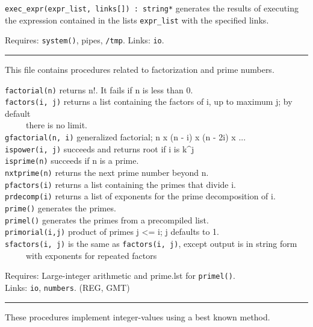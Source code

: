 \texttt{exec\_expr(expr\_list, links[]) : string*} generates the results
of executing the expression contained in the lists \texttt{expr\_list}
with the specified links.

Requires: \texttt{system()}, pipes, \texttt{/tmp}. Links: \texttt{io}.


\vspace{0.25cm}\hrule{}

This file contains procedures related to factorization and prime
numbers.

\texttt{factorial(n)} returns n!. It fails if n is
less than 0.\\
\texttt{factors(i, j)} returns a list containing the factors of i, up to
maximum j; by default\\
 \ \ \ \ \ there is no limit.\\
\texttt{gfactorial(n, i)} generalized factorial; n x (n - i) x (n - 2i)
x ...\\
\texttt{ispower(i, j)} succeeds and returns root if i is k\^{}j\\
\texttt{is}\texttt{prime(n)} succeeds if n is a
prime.\\
\texttt{nxtprime(n)} returns the next prime number beyond n.\\
\texttt{pfactors(i)} returns a list containing the primes that divide
i.\\
\texttt{prdecomp(i)} returns a list of exponents for the prime
decomposition of i.\\
\texttt{prime()} generates the primes.\\
\texttt{primel()} generates the primes from a precompiled list.\\
\texttt{primorial(i,j)} product of primes j {\textless}= i; j defaults
to 1.\\
\texttt{sfactors(i, j)} is the same as \texttt{factors(i, j)}, except
output is in string form\\
 \ \ \ \ \ with exponents for repeated factors

Requires: Large-integer arithmetic and prime.lst for
\texttt{primel()}.\\
Links: \texttt{io}, \texttt{numbers}. (REG, GMT)

\vspace{0.25cm}\hrule{}

These procedures implement integer-values using a best known method.

